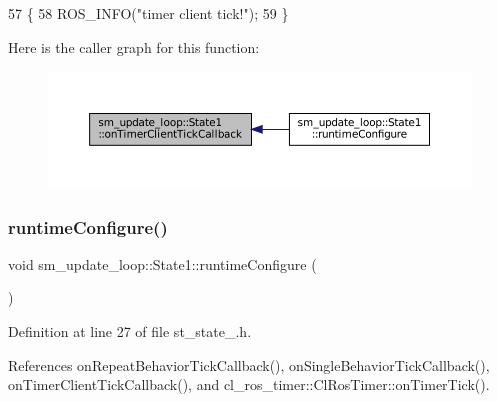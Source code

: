\begin{DoxyCode}
57     \{
58         ROS\_INFO(\textcolor{stringliteral}{"timer client tick!"});
59     \}
\end{DoxyCode}
Here is the caller graph for this function\+:
\nopagebreak
\begin{figure}[H]
\begin{center}
\leavevmode
\includegraphics[width=350pt]{structsm__update__loop_1_1State1_af132641f3167a2224249c70d072b6574_icgraph}
\end{center}
\end{figure}
\mbox{\label{structsm__update__loop_1_1State1_a9a4c0a2a171bc9c2d7686562000075b4}} 
\subsubsection{\texorpdfstring{runtime\+Configure()}{runtimeConfigure()}}
{\footnotesize\ttfamily void sm\+\_\+update\+\_\+loop\+::\+State1\+::runtime\+Configure (\begin{DoxyParamCaption}{ }\end{DoxyParamCaption})\hspace{0.3cm}{\ttfamily [inline]}}



Definition at line 27 of file st\+\_\+state\+\_.\+h.



References on\+Repeat\+Behavior\+Tick\+Callback(), on\+Single\+Behavior\+Tick\+Callback(), on\+Timer\+Client\+Tick\+Callback(), and cl\+\_\+ros\+\_\+timer\+::\+Cl\+Ros\+Timer\+::on\+Timer\+Tick().


